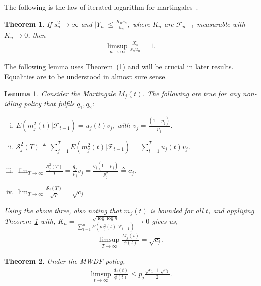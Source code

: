\documentclass[letterpaper, 10 pt, conference]{ieeeconf}
\newtheorem{lemma}{Lemma}
\newtheorem{theorem}{Theorem}
\begin{document}
The following is the law of iterated logarithm for martingales~\cite{c4}.
\begin{theorem}
\label{theorem:stout}
If $s_{n}^{2} \to \infty$ and $|Y_{n}| \leq \frac{ K_{n}  s_{n} }{u_{n}}$, where $K_{n}$ are $\mathcal{F}_{n-1}$ measurable with $K_{n} \to 0$, then 
\begin{align}\label{eq:pf6}
\limsup_{n\to\infty}  \frac{X_{n}}{s_{n} u_{ n}} = 1.
\end{align}
\end{theorem}
 The following lemma uses Theorem~(\ref{theorem:stout}) and will be crucial in later results. Equalities are to be understood in almost sure sense.
 \begin{lemma}\label{lemma3}
 Consider the Martingale $M_{j}(t)$. The following are true for any non-idling policy that fulfils $q_{1},q_{2}$:
 \begin{enumerate}[(i).]
 \item $E(m_{j}^{2}(t) |\mathcal{F}_{t-1} ) = u_{j}(t)  v_{j} $, with $v_{j} = \frac{(1-p_{j})}{p_{j}}$. 
 \item $\mathcal{S}^{2}_{j}(T) \triangleq \sum_{j=1}^{T}E(m_{j}^{2}(t) |\mathcal{F}_{t-1} ) = \sum_{t=1}^{T}u_{j}(t)  v_{j} $.
 \item $\lim_{T\to\infty}\frac{\mathcal{S}^{2}_{j}(T) }{T}  = \frac{q_{j} }{p_{j}} v_{j}  = \frac{q_{j} (1-p_{j})}{p_{j}^{2}}\triangleq c_{j} $.
 \item $\lim_{T\to\infty} \frac{\mathcal{S}_{j}(T) }{\sqrt{T}}  = \sqrt{c_{j}}  $
 \end{enumerate}
 Using the above three, also noting that $m_{j}(t)$ is bounded for all $t$, and appliying Theorem~\ref{theorem:stout} with, $K_{n} = \frac{\sqrt{\log\log n }} { \sum_{t=1}^{n}E(m_{j}^{2}(t) |\mathcal{F}_{t-1} )} \to 0	$ gives us,
 \begin{align}\label{eq:pf7}
 \limsup_{T\to\infty} \frac{M_{j}(t)}{\phi(t)} = \sqrt{c_{j}}.
 \end{align}
 \end{lemma}

\begin{theorem}\label{theorem:main}
Under the MWDF policy, 
\begin{align}
\limsup_{t\to\infty}\frac{d_{j}(t)}{\phi(t)} \leq p_{j} \frac{\sqrt{c_{1}} + \sqrt{c_{2}}}{2} .
\end{align}
\end{theorem}
\end{document}
